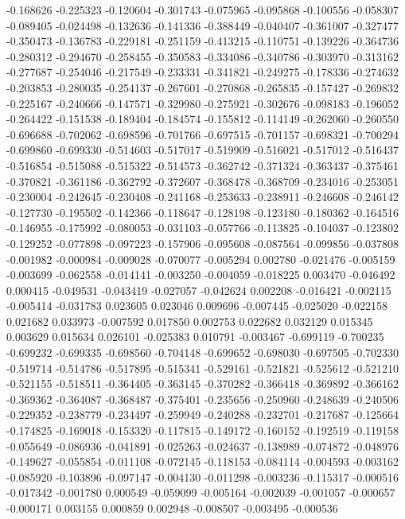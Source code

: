 -0.168626
-0.225323
-0.120604
-0.301743
-0.075965
-0.095868
-0.100556
-0.058307
-0.089405
-0.024498
-0.132636
-0.141336
-0.388449
-0.040407
-0.361007
-0.327477
-0.350473
-0.136783
-0.229181
-0.251159
-0.413215
-0.110751
-0.139226
-0.364736
-0.280312
-0.294670
-0.258455
-0.350583
-0.334086
-0.340786
-0.303970
-0.313162
-0.277687
-0.254046
-0.217549
-0.233331
-0.341821
-0.249275
-0.178336
-0.274632
-0.203853
-0.280035
-0.254137
-0.267601
-0.270868
-0.265835
-0.157427
-0.269832
-0.225167
-0.240666
-0.147571
-0.329980
-0.275921
-0.302676
-0.098183
-0.196052
-0.264422
-0.151538
-0.189404
-0.184574
-0.155812
-0.114149
-0.262060
-0.260550
-0.696688
-0.702062
-0.698596
-0.701766
-0.697515
-0.701157
-0.698321
-0.700294
-0.699860
-0.699330
-0.514603
-0.517017
-0.519909
-0.516021
-0.517012
-0.516437
-0.516854
-0.515088
-0.515322
-0.514573
-0.362742
-0.371324
-0.363437
-0.375461
-0.370821
-0.361186
-0.362792
-0.372607
-0.368478
-0.368709
-0.234016
-0.253051
-0.230004
-0.242645
-0.230408
-0.241168
-0.253633
-0.238911
-0.246608
-0.246142
-0.127730
-0.195502
-0.142366
-0.118647
-0.128198
-0.123180
-0.180362
-0.164516
-0.146955
-0.175992
-0.080053
-0.031103
-0.057766
-0.113825
-0.104037
-0.123802
-0.129252
-0.077898
-0.097223
-0.157906
-0.095608
-0.087564
-0.099856
-0.037808
-0.001982
-0.000984
-0.009028
-0.070077
-0.005294
0.002780
-0.021476
-0.005159
-0.003699
-0.062558
-0.014141
-0.003250
-0.004059
-0.018225
0.003470
-0.046492
0.000415
-0.049531
-0.043419
-0.027057
-0.042624
0.002208
-0.016421
-0.002115
-0.005414
-0.031783
0.023605
0.023046
0.009696
-0.007445
-0.025020
-0.022158
0.021682
0.033973
-0.007592
0.017850
0.002753
0.022682
0.032129
0.015345
0.003629
0.015634
0.026101
-0.025383
0.010791
-0.003467
-0.699119
-0.700235
-0.699232
-0.699335
-0.698560
-0.704148
-0.699652
-0.698030
-0.697505
-0.702330
-0.519714
-0.514786
-0.517895
-0.515341
-0.529161
-0.521821
-0.525612
-0.521210
-0.521155
-0.518511
-0.364405
-0.363145
-0.370282
-0.366418
-0.369892
-0.366162
-0.369362
-0.364087
-0.368487
-0.375401
-0.235656
-0.250960
-0.248639
-0.240506
-0.229352
-0.238779
-0.234497
-0.259949
-0.240288
-0.232701
-0.217687
-0.125664
-0.174825
-0.169018
-0.153320
-0.117815
-0.149172
-0.160152
-0.192519
-0.119158
-0.055649
-0.086936
-0.041891
-0.025263
-0.024637
-0.138989
-0.074872
-0.048976
-0.149627
-0.055854
-0.011108
-0.072145
-0.118153
-0.084114
-0.004593
-0.003162
-0.085920
-0.103896
-0.097147
-0.004130
-0.011298
-0.003236
-0.115317
-0.000516
-0.017342
-0.001780
0.000549
-0.059099
-0.005164
-0.002039
-0.001057
-0.000657
-0.000171
0.003155
0.000859
0.002948
-0.008507
-0.003495
-0.000536
